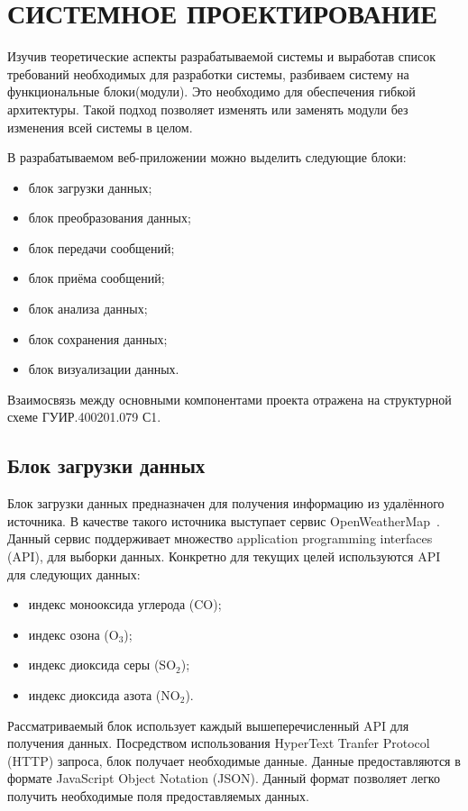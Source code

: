 \section{СИСТЕМНОЕ ПРОЕКТИРОВАНИЕ}
\label{sec:sys}

Изучив теоретические аспекты разрабатываемой системы и выработав
список требований необходимых для разработки системы, разбиваем систему
на функциональные блоки(модули). Это необходимо для обеспечения гибкой
архитектуры. Такой подход позволяет изменять или заменять модули без
изменения всей системы в целом.

В разрабатываемом веб-приложении можно выделить следующие
блоки:

\begin{itemize}
    \item блок загрузки данных;
    \item блок преобразования данных;
    \item блок передачи сообщений;
    \item блок приёма сообщений;
    \item блок анализа данных;
    \item блок сохранения данных;
    \item блок визуализации данных.
\end{itemize}
Взаимосвязь между основными компонентами проекта отражена на структурной схеме
ГУИР.400201.079 С1.

\subsection{Блок загрузки данных}

Блок загрузки данных предназначен для получения информацию из удалённого источника.
В качестве такого источника выступает сервис OpenWeatherMap~\cite{open_weather_map_index}.
Данный сервис поддерживает множество application programming interfaces (API), для выборки данных.
Конкретно для текущих целей используются API для следующих данных:
\begin{itemize}
    \item индекс монооксида углерода ($ \text{CO} $);
    \item индекс озона ($ \text{O}_{\text{3}} $);
    \item индекс диоксида серы ($ \text{SO}_{\text{2}} $);
    \item индекс диоксида азота ($ \text{NO}_{\text{2}} $).
\end{itemize}

Рассматриваемый блок использует каждый вышеперечисленный API для получения данных.
Посредством использования HyperText Tranfer Protocol (HTTP) запроса, блок получает необходимые данные.
Данные предоставляются в формате JavaScript Object Notation (JSON).
Данный формат позволяет легко получить необходимые поля предоставляемых данных.

